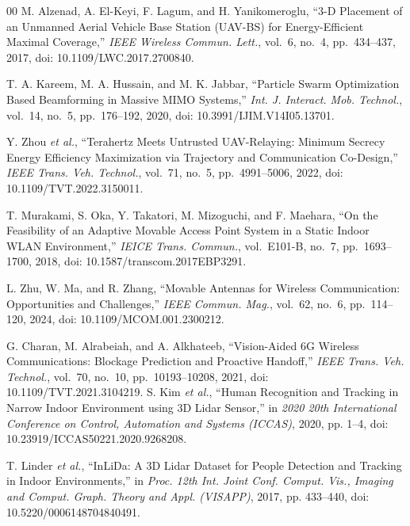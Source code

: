 \documentclass[conference]{IEEEtran}
\begin{document}
\begin{thebibliography}{00}
		M. Alzenad, A. El-Keyi, F. Lagum, and H. Yanikomeroglu,
		``3-D Placement of an Unmanned Aerial Vehicle Base Station (UAV-BS)
		for Energy-Efficient Maximal Coverage,'' \textit{IEEE Wireless
			Commun. Lett.}, vol.~6, no.~4, pp.~434--437, 2017,
		doi: 10.1109/LWC.2017.2700840.
		
		T. A. Kareem, M. A. Hussain, and M. K. Jabbar,
		``Particle Swarm Optimization Based Beamforming in Massive MIMO
		Systems,'' \textit{Int. J. Interact. Mob. Technol.}, vol.~14,
		no.~5, pp.~176--192, 2020,
		doi: 10.3991/IJIM.V14I05.13701.
		
		Y. Zhou \textit{et al.}, ``Terahertz Meets Untrusted UAV-Relaying:
		Minimum Secrecy Energy Efficiency Maximization via Trajectory and
		Communication Co-Design,'' \textit{IEEE Trans. Veh. Technol.},
		vol.~71, no.~5, pp.~4991--5006, 2022,
		doi: 10.1109/TVT.2022.3150011.
		
		T. Murakami, S. Oka, Y. Takatori, M. Mizoguchi, and F. Maehara,
		``On the Feasibility of an Adaptive Movable Access Point System in a
		Static Indoor WLAN Environment,'' \textit{IEICE Trans. Commun.},
		vol.~E101-B, no.~7, pp.~1693--1700, 2018,
		doi: 10.1587/transcom.2017EBP3291.
		
		L. Zhu, W. Ma, and R. Zhang, ``Movable Antennas for Wireless
		Communication: Opportunities and Challenges,'' \textit{IEEE Commun.
			Mag.}, vol.~62, no.~6, pp.~114--120, 2024,
		doi: 10.1109/MCOM.001.2300212.
		
		G. Charan, M. Alrabeiah, and A. Alkhateeb, ``Vision-Aided 6G
		Wireless Communications: Blockage Prediction and Proactive Handoff,''
		\textit{IEEE Trans. Veh. Technol.}, vol.~70, no.~10,
		pp.~10193--10208, 2021,
		doi: 10.1109/TVT.2021.3104219.
		S. Kim \textit{et al.}, ``Human Recognition and Tracking in Narrow Indoor Environment using 3D Lidar Sensor,'' in \textit{2020 20th International Conference on Control, Automation and Systems (ICCAS)}, 2020, pp. 1--4, doi: 10.23919/ICCAS50221.2020.9268208.
		
		T. Linder \textit{et al.}, ``InLiDa: A 3D Lidar Dataset for People Detection and Tracking in Indoor Environments,'' in \textit{Proc. 12th Int. Joint Conf. Comput. Vis., Imaging and Comput. Graph. Theory and Appl. (VISAPP)}, 2017, pp. 433--440, doi: 10.5220/0006148704840491.
		
		
	\end{thebibliography}
	
\end{document}
